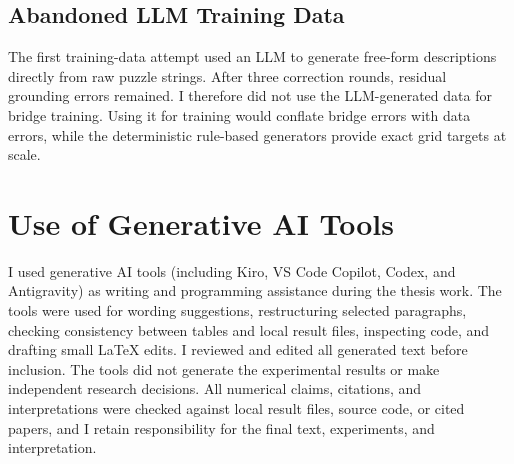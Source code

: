 \documentclass[11pt]{article}
\begin{document}
\subsection{Abandoned LLM Training Data}
\label{app:failed_experiments}
\label{app:failed_llm_correction}

The first training-data attempt used an LLM to generate free-form descriptions directly from raw puzzle strings.
After three correction rounds, residual grounding errors remained.
I therefore did not use the LLM-generated data for bridge training.
Using it for training would conflate bridge errors with data errors, while the deterministic rule-based generators provide exact grid targets at scale.


\section*{Use of Generative AI Tools}
I used generative AI tools (including Kiro, VS Code Copilot, Codex, and Antigravity) as writing and programming assistance during the thesis work.
The tools were used for wording suggestions, restructuring selected paragraphs, checking consistency between tables and local result files, inspecting code, and drafting small LaTeX edits.
I reviewed and edited all generated text before inclusion.
The tools did not generate the experimental results or make independent research decisions.
All numerical claims, citations, and interpretations were checked against local result files, source code, or cited papers, and I retain responsibility for the final text, experiments, and interpretation.
\end{document}
